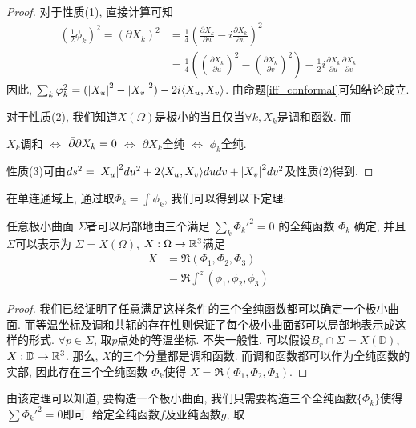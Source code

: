 \begin{proof}
    对于性质(1), 直接计算可知
    \begin{equation}
        \begin{split}
            (\frac{1}{2}\phi_k)^2=(\partial X_k)^2 &= \frac{1}{4}(\frac{\partial X_k}{\partial u} - i \frac{\partial X_k}{\partial v})^2\\
             &= \frac{1}{4}((\frac{\partial X_k}{\partial u})^2- (\frac{\partial X_k}{\partial v})^2) - \frac{1}{2}i \frac{\partial X_k}{\partial u} \frac{\partial X_k}{\partial v}
        \end{split}
    \end{equation}
    因此,  $\sum_k {\varphi}_k^2= ({\left | X_u \right |}^2- {\left | X_v \right |}^2)-2i{\left < X_u, X_v \right >}$. 由命题\eqref{iff_conformal}可知结论成立.
    \par 对于性质(2), 我们知道$X(\Omega)$是极小的当且仅当$\forall k, X_k$是调和函数. 而
    \par $X_k$调和 $\iff$ ${\bar{\partial}} \partial X_k=0$ $\iff$ $\partial X_k$全纯 $\iff$ $\phi_k$全纯.
    \par 性质(3)可由$ds^2={\left | X_u \right |}^2du^2+2{\left < X_u, X_v \right >}dudv+{\left | X_v \right |}^2dv^2$及性质(2)得到.
\end{proof}
在单连通域上, 通过取$\Phi_k = \int \phi_k$, 我们可以得到以下定理:
\begin{theorem}[Weierstrass表示]
    任意极小曲面 $\Sigma$者可以局部地由三个满足 $\sum_k \Phi_k'^2=0$ 的全纯函数 $\Phi_k$ 确定, 并且$\Sigma$可以表示为 $\Sigma=X(\Omega)$, $X: \Omega \to {\mathbb{R}}^3$满足 
    \begin{equation}
        \begin{split}
            X &=\Re (\Phi_1,\Phi_2,\Phi_3) \\
             &=\Re \int^z (\phi_1,\phi_2,\phi_3)
        \end{split}
    \end{equation}
\end{theorem}
\begin{proof}
    我们已经证明了任意满足这样条件的三个全纯函数都可以确定一个极小曲面. 而等温坐标及调和共轭的存在性则保证了每个极小曲面都可以局部地表示成这样的形式.  $\forall p \in \Sigma$, 取$p$点处的等温坐标. 不失一般性, 可以假设$B_r \cap \Sigma= X(\mathbb{D})$, $X: \mathbb{D} \to {\mathbb{R}}^3$. 那么, $X$的三个分量都是调和函数. 而调和函数都可以作为全纯函数的实部,  因此存在三个全纯函数 $\Phi_k$使得  $X=\Re(\Phi_1,\Phi_2,\Phi_3)$.
\end{proof}
由该定理可以知道, 要构造一个极小曲面, 我们只需要构造三个全纯函数$\{\Phi_k\}$使得 $\sum \Phi_k'^2=0$即可. 给定全纯函数$f$及亚纯函数$g$, 取
